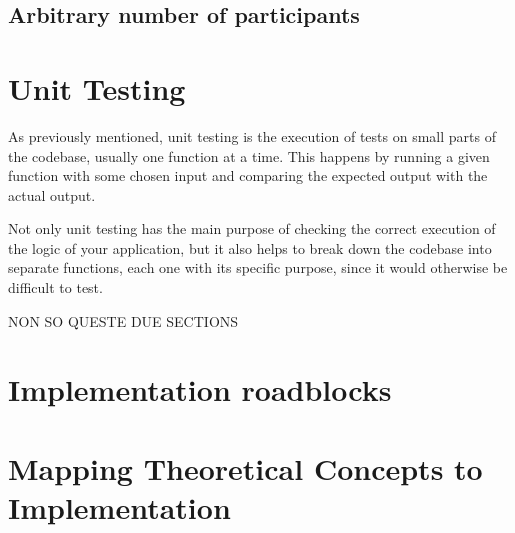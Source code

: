 \subsection{Arbitrary number of participants}


\section{Unit Testing}
As previously mentioned, unit testing is the execution of tests on small parts of the codebase, usually one function at a time. This happens by running a given function with some chosen input and comparing the expected output with the actual output. 

Not only unit testing has the main purpose of checking the correct execution of the logic of your application, but it also helps to break down the codebase into separate functions, each one with its specific purpose, since it would otherwise be difficult to test.


NON SO QUESTE DUE SECTIONS
\section{Implementation roadblocks}


\section{Mapping Theoretical Concepts to Implementation}
